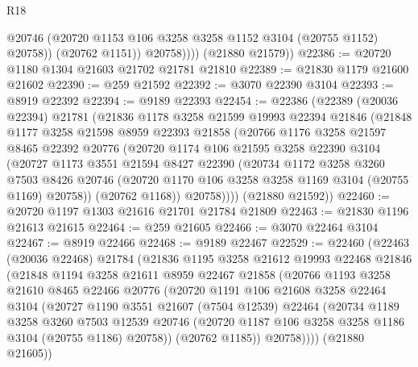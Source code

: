 \begin{lexlean}{R18}
\begin{coremodule}
                  @20746
                  (@20720 @1153 @106 @3258 @3258 @1152 @3104 (@20755 @1152) @20758))
                (@20762 @1151))
              @20758))))
      (@21880 @21579))
@22386 := @20720 @1180 @1304 @21603 @21702 @21781 @21810
@22389 := @21830 @1179 @21600 @21602
@22390 := @259 @21592
@22392 := @3070 @22390 @3104
@22393 := @8919 @22392
@22394 := @9189 @22393
@22454 := @22386
    (@22389
      (@20036 @22394)
      @21781
      (@21836
        @1178
        @3258
        @21599
        @19993
        @22394
        @21846
        (@21848
          @1177
          @3258
          @21598
          @8959
          @22393
          @21858
          (@20766
            @1176
            @3258
            @21597
            @8465
            @22392
            @20776
            (@20720
              @1174
              @106
              @21595
              @3258
              @22390
              @3104
              (@20727
                @1173
                @3551
                @21594
                @8427
                @22390
                (@20734
                  @1172
                  @3258
                  @3260
                  @7503
                  @8426
                  @20746
                  (@20720 @1170 @106 @3258 @3258 @1169 @3104 (@20755 @1169) @20758))
                (@20762 @1168))
              @20758))))
      (@21880 @21592))
@22460 := @20720 @1197 @1303 @21616 @21701 @21784 @21809
@22463 := @21830 @1196 @21613 @21615
@22464 := @259 @21605
@22466 := @3070 @22464 @3104
@22467 := @8919 @22466
@22468 := @9189 @22467
@22529 := @22460
    (@22463
      (@20036 @22468)
      @21784
      (@21836
        @1195
        @3258
        @21612
        @19993
        @22468
        @21846
        (@21848
          @1194
          @3258
          @21611
          @8959
          @22467
          @21858
          (@20766
            @1193
            @3258
            @21610
            @8465
            @22466
            @20776
            (@20720
              @1191
              @106
              @21608
              @3258
              @22464
              @3104
              (@20727
                @1190
                @3551
                @21607
                (@7504 @12539)
                @22464
                (@20734
                  @1189
                  @3258
                  @3260
                  @7503
                  @12539
                  @20746
                  (@20720 @1187 @106 @3258 @3258 @1186 @3104 (@20755 @1186) @20758))
                (@20762 @1185))
              @20758))))
      (@21880 @21605))

\end{coremodule}
\end{lexlean}
